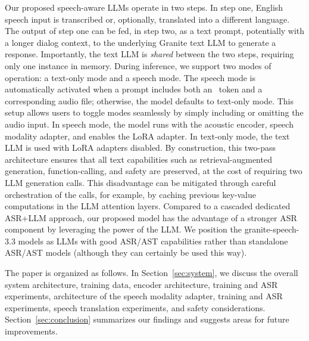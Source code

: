 \documentclass[9pt,conference]{IEEEtran}
\newcommand{\audiosym}{{\tt <|audio|>}}
\begin{document}
Our proposed speech-aware LLMs operate in two steps. In step one, English speech input is transcribed or, optionally, translated into a different language. The output of step one can be fed, in step two, as a text prompt, potentially with a longer dialog context, to the underlying Granite text LLM to generate a response. Importantly, the text LLM is {\em shared} between the two steps, requiring only one instance in memory. 
During inference, we support two modes of operation: a text-only mode and a speech mode. The speech mode is automatically activated when a prompt includes both an \audiosym\ token and a corresponding audio file; otherwise, the model defaults to text-only mode. This setup allows users to toggle modes seamlessly by simply including or omitting the audio input.
In speech mode, the model runs with the acoustic encoder, speech modality adapter, and enables the LoRA adapter. In text-only mode, the text LLM is used with LoRA adapters disabled. 
By construction, this two-pass architecture ensures that all text capabilities such as retrieval-augmented generation, function-calling, and safety are preserved, at the cost of requiring two LLM generation calls.
This disadvantage can be mitigated through careful orchestration of the calls, for example, by caching previous key-value computations in the LLM attention layers. Compared to a cascaded dedicated ASR+LLM approach, our proposed model has the advantage of a stronger ASR component by leveraging the power of the LLM. We position the granite-speech-3.3 models as LLMs with good ASR/AST capabilities rather than standalone ASR/AST models (although they can certainly be used this way).

The paper is organized as follows. In Section~\ref{sec:system}, we discuss the overall system architecture, training data, encoder architecture, training and ASR experiments, architecture of the speech modality adapter, training and ASR experiments, speech translation experiments, and safety considerations. Section~\ref{sec:conclusion} summarizes our findings and suggests areas for future improvements.
\end{document}
